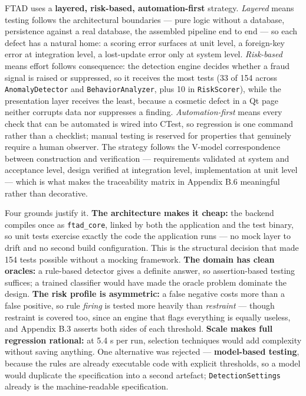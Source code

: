 \documentclass[
  12pt,
]{report}
\begin{document}
FTAD uses a \textbf{layered, risk-based, automation-first} strategy.
\emph{Layered} means testing follows the architectural boundaries ---
pure logic without a database, persistence against a real database, the
assembled pipeline end to end --- so each defect has a natural home: a
scoring error surfaces at unit level, a foreign-key error at integration
level, a lost-update error only at system level. \emph{Risk-based} means
effort follows consequence: the detection engine decides whether a fraud
signal is raised or suppressed, so it receives the most tests (33 of 154
across \texttt{AnomalyDetector} and \texttt{Behavior\-Analyzer}, plus 10
in \texttt{RiskScorer}), while the presentation layer receives the
least, because a cosmetic defect in a Qt page neither corrupts data nor
suppresses a finding. \emph{Automation-first} means every check that can
be automated is wired into CTest, so regression is one command rather
than a checklist; manual testing is reserved for properties that
genuinely require a human observer. The strategy follows the V-model
correspondence between construction and verification --- requirements
validated at system and acceptance level, design verified at integration
level, implementation at unit level --- which is what makes the
traceability matrix in Appendix B.6 meaningful rather than decorative.

Four grounds justify it. \textbf{The architecture makes it cheap:} the
backend compiles once as \texttt{ftad\_core}, linked by both the
application and the test binary, so unit tests exercise exactly the code
the application runs --- no mock layer to drift and no second build
configuration. This is the structural decision that made 154 tests
possible without a mocking framework. \textbf{The domain has clean
oracles:} a rule-based detector gives a definite answer, so
assertion-based testing suffices; a trained classifier would have made
the oracle problem dominate the design. \textbf{The risk profile is
asymmetric:} a false negative costs more than a false positive, so rule
\emph{firing} is tested more heavily than \emph{restraint} --- though
restraint is covered too, since an engine that flags everything is
equally useless, and Appendix B.3 asserts both sides of each threshold.
\textbf{Scale makes full regression rational:} at 5.4 s per run,
selection techniques would add complexity without saving anything. One
alternative was rejected --- \textbf{model-based testing}, because the
rules are already executable code with explicit thresholds, so a model
would duplicate the specification into a second artefact;
\texttt{Detection\-Settings} already is the machine-readable
specification.
\end{document}
